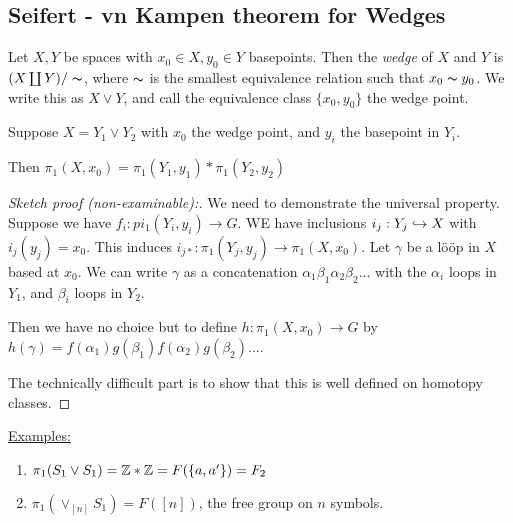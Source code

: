 \documentclass[10pt,a4paper]{article}
\begin{document}
\subsection*{Seifert - vn Kampen theorem for Wedges}
Let $X,Y$ be spaces with $x_0 \in X, y_0 \in Y$ basepoints. Then the \emph{wedge} of $X$ and $Y$ is $(X \coprod Y)/\thicksim$, where $\thicksim$ is the smallest equivalence relation such that $x_0 \thicksim y_0$. We write this as $X \vee Y$, and call the equivalence class $\{x_0, y_0\}$ the wedge point.

\begin{theorem}
Suppose $X = Y_1 \vee Y_2$ with $x_0$ the wedge point, and $y_i$ the basepoint in $Y_i$.

Then $\pi_1(X,x_0) = \pi_1(Y_1, y_1) \ast \pi_1(Y_2, y_2)$ 
\end{theorem}
\begin{proof}[Sketch proof (non-examinable):]
We need to demonstrate the universal property. Suppose we have $f_i:pi_1(Y_i, y_i) \to G$. WE have inclusions $i_j : Y_j \hookrightarrow X$ with $i_j(y_j) = x_0$. This induces $i_{j\ast}:\pi_1(Y_j, y_j) \to \pi_1(X, x_0)$. Let $\gamma$ be a l\"o\"op in $X$ based at $x_0$. We can write $\gamma$ as a concatenation $\alpha_1 \beta_1 \alpha_2 \beta_2 \ldots$ with the $\alpha_i$ loops in $Y_1$, and $\beta_i$ loops in $Y_2$.

Then we have no choice but to define $h:\pi_1(X,x_0) \to G$ by $h(\gamma) = f(\alpha_1)g(\beta_1)f(\alpha_2)g(\beta_2)\ldots$.

The technically difficult part is to show that this is well defined on homotopy classes.
\end{proof}

\underline{Examples:}
\begin{enumerate}
\item $\pi_1(S_1 \vee S_1) = \mathbb{Z} \ast \mathbb{Z} = F(\{a, a'\}) = F_2$
\item $\pi_1(\vee_{[n]} S_1) = F([n])$, the free group on $n$ symbols.
\end{enumerate}
\end{document}
